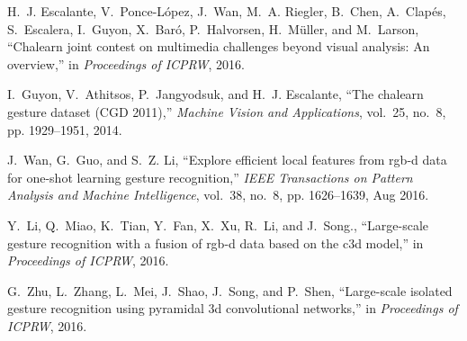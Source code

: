 \documentclass[10pt, a4paper, conference]{IEEEtran}
\begin{document}
\begin{thebibliography}{10}
H.~J. Escalante, V.~Ponce-López, J.~Wan, M.~A. Riegler, B.~Chen, A.~Clapés,
  S.~Escalera, I.~Guyon, X.~Baró, P.~Halvorsen, H.~Müller, and M.~Larson,
  ``Chalearn joint contest on multimedia challenges beyond visual analysis: An
  overview,'' in \emph{Proceedings of ICPRW}, 2016.

I.~Guyon, V.~Athitsos, P.~Jangyodsuk, and H.~J. Escalante, ``The chalearn
  gesture dataset ({CGD} 2011),'' \emph{Machine Vision and Applications},
  vol.~25, no.~8, pp. 1929--1951, 2014.

J.~Wan, G.~Guo, and S.~Z. Li, ``Explore efficient local features from rgb-d
  data for one-shot learning gesture recognition,'' \emph{IEEE Transactions on
  Pattern Analysis and Machine Intelligence}, vol.~38, no.~8, pp. 1626--1639,
  Aug 2016.

Y.~Li, Q.~Miao, K.~Tian, Y.~Fan, X.~Xu, R.~Li, and J.~Song., ``Large-scale
  gesture recognition with a fusion of rgb-d data based on the c3d model,'' in
  \emph{Proceedings of ICPRW}, 2016.

G.~Zhu, L.~Zhang, L.~Mei, J.~Shao, J.~Song, and P.~Shen, ``Large-scale isolated
  gesture recognition using pyramidal 3d convolutional networks,'' in
  \emph{Proceedings of ICPRW}, 2016.

\end{thebibliography}


\end{document}
